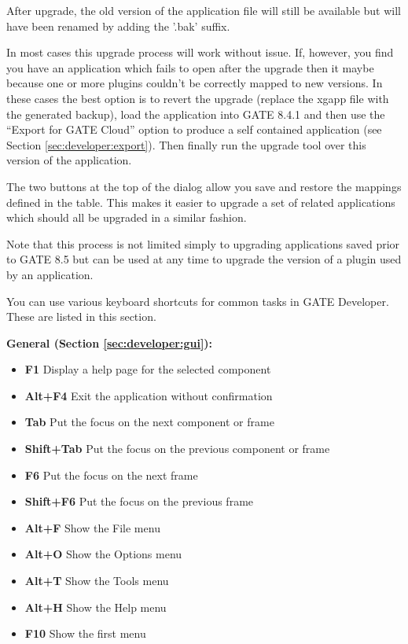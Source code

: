 After upgrade, the old version of the application file will still be available but will have been renamed by adding the '.bak' suffix.

In most cases this upgrade process will work without issue. If, however, you find you have an application which fails to open after the upgrade then it
maybe because one or more plugins couldn't be correctly mapped to new versions. In these cases the best option is to revert the upgrade (replace the xgapp file
with the generated backup), load the application into GATE 8.4.1 and then use the ``Export for GATE Cloud'' option to produce a self contained application (see
Section \ref{sec:developer:export}). Then finally run the upgrade tool over this version of the application.

The two buttons at the top of the dialog allow you save and restore the mappings defined in the table. This makes it easier to upgrade a set of
related applications which should all be upgraded in a similar fashion.

Note that this process is not limited simply to upgrading applications saved prior to GATE 8.5 but can be used at any time to upgrade
the version of a plugin used by an application.


You can use various keyboard shortcuts for common tasks in GATE Developer.
These are listed in this section.

{\bf General (Section \ref{sec:developer:gui}):}

\begin{itemize}
\item {\bf F1} Display a help page for the selected component
\item {\bf Alt+F4} Exit the application without confirmation
\item {\bf Tab} Put the focus on the next component or frame
\item {\bf Shift+Tab} Put the focus on the previous component or frame
\item {\bf F6} Put the focus on the next frame
\item {\bf Shift+F6} Put the focus on the previous frame
\item {\bf Alt+F} Show the File menu
\item {\bf Alt+O} Show the Options menu
\item {\bf Alt+T} Show the Tools menu
\item {\bf Alt+H} Show the Help menu
\item {\bf F10} Show the first menu
\end{itemize}



